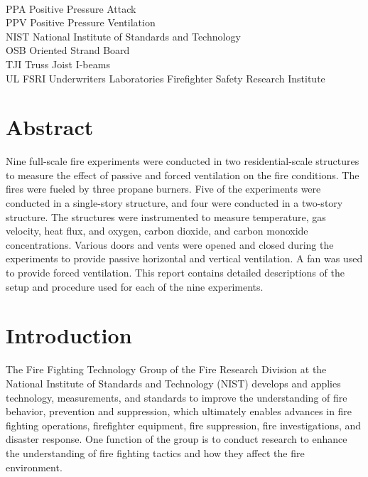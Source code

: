 \documentclass[12pt,oneside]{book}
\begin{document}
\begin{tabbing}
\hspace{1.5in} \= \\
PPA \> Positive Pressure Attack \\
PPV \> Positive Pressure Ventilation \\
NIST \> National Institute of Standards and Technology \\
OSB \> Oriented Strand Board \\
TJI \> Truss Joist I-beams \\
UL FSRI \> Underwriters Laboratories Firefighter Safety Research Institute \\
\end{tabbing}

\mainmatter

\chapter*{\centering Abstract}
Nine full-scale fire experiments were conducted in two residential-scale structures to measure the effect of passive and forced ventilation on the fire conditions. The fires were fueled by three propane burners. Five of the experiments were conducted in a single-story structure, and four were conducted in a two-story structure. The structures were instrumented to measure temperature, gas velocity, heat flux, and oxygen, carbon dioxide, and carbon monoxide concentrations. Various doors and vents were opened and closed during the experiments to provide passive horizontal and vertical ventilation. A fan was used to provide forced ventilation. This report contains detailed descriptions of the setup and procedure used for each of the nine experiments.

\mainmatter

\chapter{Introduction}
\label{chap:Introduction}
The Fire Fighting Technology Group of the Fire Research Division at the National Institute of Standards and Technology (NIST) develops and applies technology, measurements, and standards to improve the understanding of fire behavior, prevention and suppression, which ultimately enables advances in fire fighting operations, firefighter equipment, fire suppression, fire investigations, and disaster response. One function of the group is to conduct research to enhance the understanding of fire fighting tactics and how they affect the fire environment.
\end{document}
